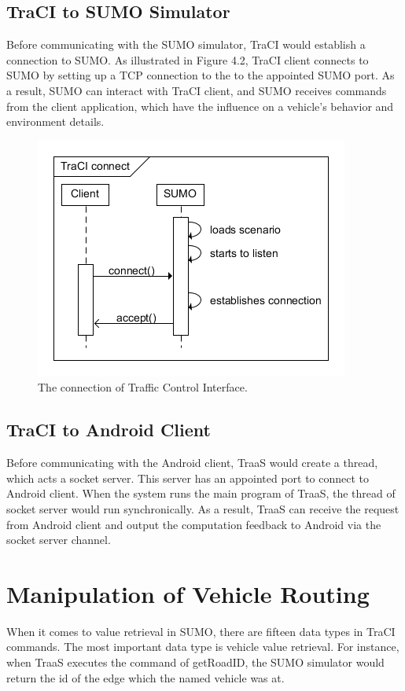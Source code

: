\documentclass[12pt]{ksthesis}
\begin{document}
\begin{thesis}
{\subsection{TraCI to SUMO Simulator}
Before communicating with the SUMO simulator, TraCI would establish a connection to SUMO. As illustrated in Figure 4.2, TraCI client connects to SUMO by setting up a TCP connection to the to the appointed SUMO port. As a result, SUMO can interact with TraCI client, and SUMO receives commands from the client application, which have the influence on a vehicle’s behavior and environment details.

\begin{figure}[t!]
\centering
\includegraphics[scale=1]{./Thesis_figures/F4-2_TraCI_connection.PNG}
\caption{\large The connection of Traffic Control Interface.}
\vspace{0.5cm}
\label{Fig:TraCI_connection}
\end{figure}


\subsection{TraCI to Android Client}
Before communicating with the Android client, TraaS would create a thread, which acts a socket server. This server has an appointed port to connect to Android client. When the system runs the main program of TraaS, the thread of socket server would run synchronically. As a result, TraaS can receive the request from Android client and output the computation feedback to Android via the socket server channel.

\section{Manipulation of Vehicle Routing}
When it comes to value retrieval in SUMO, there are fifteen data types in TraCI commands. The most important data type is vehicle value retrieval. For instance, when TraaS executes the command of getRoadID, the SUMO simulator would return the id of the edge which the named vehicle was at.

}
\end{thesis}
\end{document}
